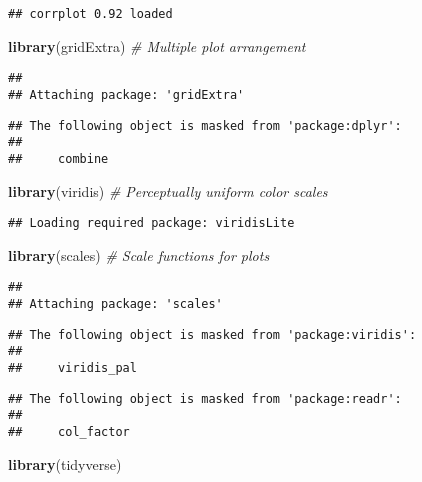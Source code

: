 \documentclass[
]{article}
\newenvironment{Shaded}{\begin{snugshade}}{\end{snugshade}}
\newcommand{\CommentTok}[1]{\textcolor[rgb]{0.56,0.35,0.01}{\textit{#1}}}
\newcommand{\FunctionTok}[1]{\textcolor[rgb]{0.13,0.29,0.53}{\textbf{#1}}}
\newcommand{\NormalTok}[1]{#1}
\begin{document}
\begin{verbatim}
## corrplot 0.92 loaded
\end{verbatim}

\begin{Shaded}
\begin{Highlighting}[]
\FunctionTok{library}\NormalTok{(gridExtra)    }\CommentTok{\# Multiple plot arrangement}
\end{Highlighting}
\end{Shaded}

\begin{verbatim}
## 
## Attaching package: 'gridExtra'
\end{verbatim}

\begin{verbatim}
## The following object is masked from 'package:dplyr':
## 
##     combine
\end{verbatim}

\begin{Shaded}
\begin{Highlighting}[]
\FunctionTok{library}\NormalTok{(viridis)      }\CommentTok{\# Perceptually uniform color scales}
\end{Highlighting}
\end{Shaded}

\begin{verbatim}
## Loading required package: viridisLite
\end{verbatim}

\begin{Shaded}
\begin{Highlighting}[]
\FunctionTok{library}\NormalTok{(scales)       }\CommentTok{\# Scale functions for plots}
\end{Highlighting}
\end{Shaded}

\begin{verbatim}
## 
## Attaching package: 'scales'
\end{verbatim}

\begin{verbatim}
## The following object is masked from 'package:viridis':
## 
##     viridis_pal
\end{verbatim}

\begin{verbatim}
## The following object is masked from 'package:readr':
## 
##     col_factor
\end{verbatim}

\begin{Shaded}
\begin{Highlighting}[]
\FunctionTok{library}\NormalTok{(tidyverse)}
\end{Highlighting}
\end{Shaded}
\end{document}
